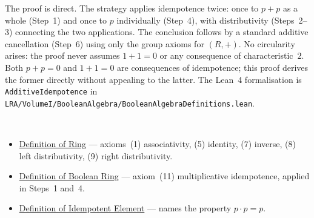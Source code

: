 \begin{remark*}
The proof is direct.
The strategy applies idempotence twice: once to $p + p$ as a
whole (Step~1) and once to $p$ individually (Step~4), with
distributivity (Steps~2--3) connecting the two applications.
The conclusion follows by a standard additive cancellation
(Step~6) using only the group axioms for $(R,+)$.
No circularity arises: the proof never assumes $1 + 1 = 0$
or any consequence of characteristic~$2$.
Both $p + p = 0$ and $1 + 1 = 0$ are consequences of
idempotence; this proof derives the former directly without
appealing to the latter.
The Lean~4 formalisation is \texttt{AdditiveIdempotence} in
\texttt{LRA/VolumeI/BooleanAlgebra/BooleanAlgebraDefinitions.lean}.
\end{remark*}

\begin{remark*}[Dependencies]~\\
\begin{itemize}
  \item \hyperref[def:ring]{Definition of Ring}
        --- axioms~(1) associativity, (5) identity, (7) inverse,
        (8) left distributivity, (9) right distributivity.
  \item \hyperref[def:boolean-ring]{Definition of Boolean Ring}
        --- axiom~(11) multiplicative idempotence,
        applied in Steps~1 and~4.
  \item \hyperref[def:idempotent-element]{Definition of Idempotent Element}
        --- names the property $p \cdot p = p$.
\end{itemize}
\end{remark*}
